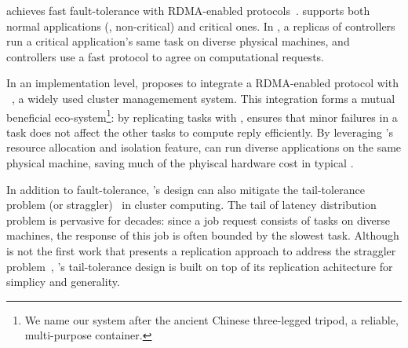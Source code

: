 \xxx achieves fast fault-tolerance with RDMA-enabled 
\paxos protocols~\cite{dare:hpdc15, falcon:github}. \xxx supports both normal 
applications (\ie, non-critical) and critical ones. In \xxx, a replicas of 
controllers run a critical application's same task on diverse physical 
machines, and controllers use a fast \paxos protocol to agree on computational 
requests. 

In an implementation level, \xxx proposes to integrate a RDMA-enabled \paxos 
protocol with \mesos~\cite{mesos:nsdi11}, a widely used cluster managemement 
system. This integration forms a mutual beneficial eco-system\footnote{We name 
our system after the ancient Chinese three-legged tripod, a reliable, 
multi-purpose container.}: by replicating tasks with \paxos, \xxx ensures that 
minor failures in a task does not affect the other tasks to compute reply 
efficiently. By leveraging \mesos's resource allocation and isolation feature, 
\xxx can run diverse applications on the same physical machine, saving much of 
the phyiscal hardware cost in typical \paxos.




In addition to fault-tolerance, \xxx's design can also mitigate the 
tail-tolerance problem (or straggler)~\cite{tail:cacm13} in cluster computing. 
The tail of latency distribution problem is pervasive for decades: since a 
job request consists of tasks on diverse machines, the response of this 
job is often bounded by the slowest task. Although \xxx is not the first work 
that presents a replication approach to address the straggler 
problem~\cite{dolly:nsdi13}, \xxx's tail-tolerance design is built on top of its 
\paxos replication achitecture for simplicy and generality.


